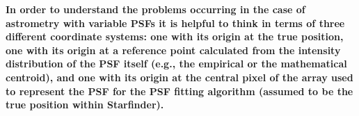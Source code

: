 {\bf In order to understand the problems occurring in the case of astrometry with variable PSFs it is helpful to think in terms of three different coordinate systems: one with its origin at the true position, one with its origin at a reference point calculated from the intensity distribution of the PSF itself (e.g., the empirical or the mathematical centroid), and one with its origin at the central pixel of the array used to represent the PSF for the PSF fitting algorithm (assumed to be the true position within Starfinder).}
